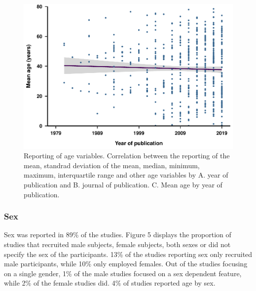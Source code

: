 \documentclass[
  english,
  jou,floatsintext]{apa6}
\begin{document}
\begin{figure}
\centering
\includegraphics{article_files/figure-latex/unnamed-chunk-8-1.pdf}
\caption{\label{fig:unnamed-chunk-8}Reporting of age variables. Correlation between the reporting of the mean, standrad deviation of the mean, median, minimum, maximum, interquartile range and other age variables by A. year of publication and B. journal of publication. C. Mean age by year of publication.}
\end{figure}

\hypertarget{sex}{%
\subsubsection{Sex}\label{sex}}

Sex was reported in 89\% of the studies. Figure 5 displays the proportion of studies that recruited male subjects, female subjects, both sexes or did not specify the sex of the participants. 13\% of the studies reporting sex only recruited male participants, while 10\% only employed females. Out of the studies focusing on a single gender, 1\% of the male studies focused on a sex dependent feature, while 2\% of the female studies did. 4\% of studies reported age by sex.
\end{document}
